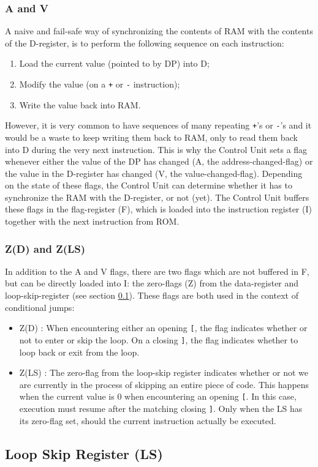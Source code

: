 \subsubsection{A and V}
A naive and fail-safe way of synchronizing the contents of RAM with the contents of the D-register, is to perform the following sequence on each instruction:
\begin{enumerate}
\item Load the current value (pointed to by DP) into D;
\item Modify the value (on a \texttt{+} or \texttt{-} instruction);
\item Write the value back into RAM.
\end{enumerate}
However, it is very common to have sequences of many repeating \texttt{+}'s or \texttt{-}'s and it would be a waste to keep writing them back to RAM, only to read them back into D during the very next instruction. This is why the Control Unit sets a flag whenever either the value of the DP has changed (A, the address-changed-flag) or the value in the D-register has changed (V, the value-changed-flag). Depending on the state of these flags, the Control Unit can determine whether it has to synchronize the RAM with the D-register, or not (yet). The Control Unit buffers these flags in the flag-register (F), which is loaded into the instruction register (I) together with the next instruction from ROM.

\subsubsection{Z(D) and Z(LS)}
In addition to the A and V flags, there are two flags which are not buffered in F, but can be directly loaded into I: the zero-flags (Z) from the data-register and loop-skip-register (see section \ref{sec:architecture:loopskip}). These flags are both used in the context of conditional jumps:
\begin{itemize}
\item Z(D) : When encountering either an opening \texttt{[}, the flag indicates whether or not to enter or skip the loop. On a closing \texttt{]}, the flag indicates whether to loop back or exit from the loop.
\item Z(LS) : The zero-flag from the loop-skip register indicates whether or not we are currently in the process of skipping an entire piece of code. This happens when the current value is 0 when encountering an opening \texttt{[}. In this case, execution must resume after the matching closing \texttt{]}. Only when the LS has its zero-flag set, should the current instruction actually be executed.
\end{itemize}

\subsection{Loop Skip Register (LS)} \label{sec:architecture:loopskip}


